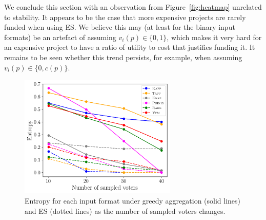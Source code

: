 \documentclass[letterpaper]{article} %
\newcommand{\kibitz}[2]{\ifnum\Comments=1{\color{#1}{#2}}\fi}
\newcommand{\rf}[1]{\kibitz{blue}{[Roy says:#1]}}
\newcommand{\mes}{ES}
\begin{document}

We conclude this section with an observation from  Figure~\ref{fig:heatmap} unrelated to stability. It appears to be the case that more expensive projects are rarely funded  when using \mes{}.  We believe this may (at least for the binary input formats)  be an artefact of assuming $v_i(p)\in \{0,1\}$, which makes it very hard for an expensive project to have a ratio of utility to cost that justifies funding it. It remains to be seen whether this trend persists, for example, when assuming $v_i(p)\in \{0,c(p)\}$.


\begin{figure}[!h]
\begin{center}
\includegraphics[width=7.5cm]{experiment/entropy_small_a.png}
\caption{Entropy for each input format under  greedy aggregation  (solid lines) and \mes{} (dotted lines)  as the number of sampled voters changes. }\label{fig:entropy}
\end{center}
\vspace{-3mm}
\end{figure}
\end{document}
